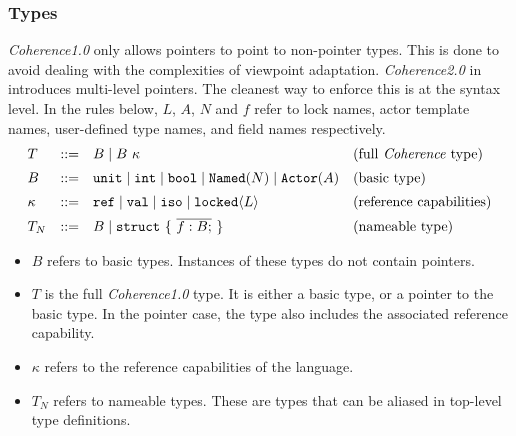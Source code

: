 \subsubsection*{Types}
\textit{Coherence1.0} only allows pointers to point to non-pointer types. This is done to avoid dealing with the complexities of viewpoint adaptation. \textit{Coherence2.0} in  introduces multi-level pointers. The cleanest way to enforce this is at the syntax level. In the rules below, $L$, $A$, $N$ and $f$ refer to lock names, actor template names, user-defined type names, and field names respectively.
\[
\begin{array}{lcll}
T & ::= & B \mid B\ \kappa & \text{(full \textit{Coherence} type)} \\[0.5em]
B & ::= & \mathtt{unit} \mid \mathtt{int} \mid \mathtt{bool} \mid \mathtt{Named}(N) \mid \mathtt{Actor}(A) & \text{(basic type)} \\[0.5em]
\kappa & ::= & \mathtt{ref} \mid \mathtt{val} \mid \mathtt{iso} \mid \mathtt{locked}\langle L \rangle & \text{(reference capabilities)} \\[0.5em]
T_N & ::= & B  \mid \mathtt{struct}\ \{\ \overline{f : B;}\ \} & \text{(nameable type)}
\end{array}
\]
\begin{itemize}
    \item $B$ refers to basic types. Instances of these types do not contain pointers.
    \item $T$ is the full \textit{Coherence1.0} type. It is either a basic type, or a pointer to the basic type. In the pointer case, the type also includes the associated reference capability.
    \item $\kappa$ refers to the reference capabilities of the language.
    \item $T_N$ refers to nameable types. These are types that can be aliased in top-level type definitions.
\end{itemize}
